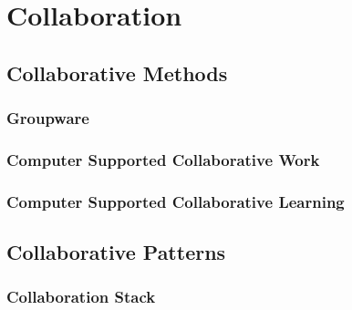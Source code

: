 \chapter{Collaboration}

\section{Collaborative Methods}

\subsection{Groupware}

\subsection{Computer Supported Collaborative Work}

\subsection{Computer Supported Collaborative Learning}

\section{Collaborative Patterns}

\subsection{Collaboration Stack}
